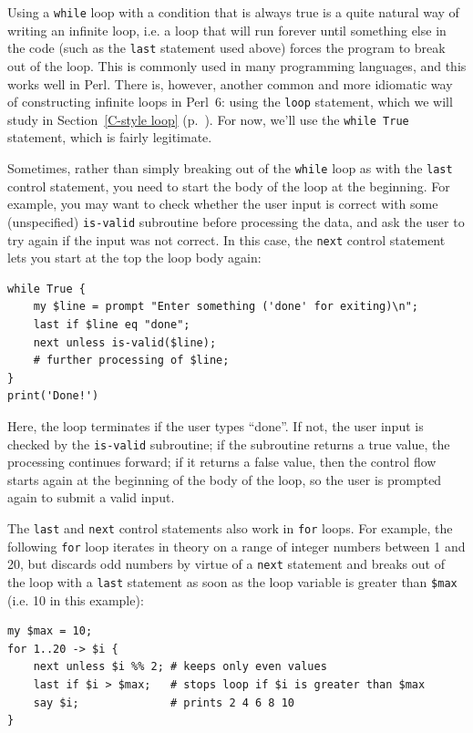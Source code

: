 Using a {\tt while} loop with a condition that is always true 
is a quite natural way of writing an infinite loop, i.e. a 
loop that will run forever until something else in the code 
(such as the {\tt last} statement used above) forces the 
program to break out of the loop. This is commonly used in 
many programming languages, and this works well in Perl. There 
is, however, another common and more idiomatic way of constructing 
infinite loops in Perl~6: using the {\tt loop} statement, 
which we will study in Section~\ref{C-style loop} 
(p.~\pageref{C-style loop}). For now, we'll use the {\tt while True} 
statement, which is fairly legitimate.

Sometimes, rather than simply breaking out of the {\tt while}  loop 
as with the {\tt last} control statement, you need to start the 
body of the loop at the beginning. For example, you may want 
to check whether the user input is correct with some 
(unspecified) {\tt is-valid} subroutine before processing 
the data, and ask the user to try again if the input was not 
correct. In this case, the {\tt next} control statement lets 
you start at the top the loop body again:

\begin{verbatim}
while True {
    my $line = prompt "Enter something ('done' for exiting)\n";
    last if $line eq "done";
    next unless is-valid($line);
    # further processing of $line;
}
print('Done!')
\end{verbatim}
%
Here, the loop terminates if the user types ``done''. If not, the user input is checked by the {\tt is-valid} subroutine; if the subroutine returns a true value, the processing continues forward; if it returns a false value, then the control flow starts again at the beginning of the body of the loop, so the user is prompted again to submit a valid input.

The {\tt last} and {\tt next} control statements also work in 
{\tt for} loops. For example, the following {\tt for} loop 
iterates in theory on a range of integer numbers between 1 and 20, 
but discards odd numbers by virtue of a {\tt next} statement 
and breaks out of the loop with a {\tt last} statement as 
soon as the loop variable is greater than {\tt \$max} (i.e. 10 in this  example):

\begin{verbatim}
my $max = 10;
for 1..20 -> $i {
    next unless $i %% 2; # keeps only even values
    last if $i > $max;   # stops loop if $i is greater than $max
    say $i;              # prints 2 4 6 8 10
}
\end{verbatim}

